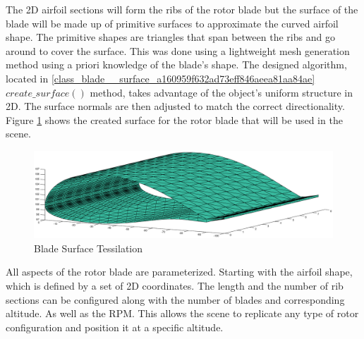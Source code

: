 The 2D airfoil sections will form the ribs of the rotor blade but the surface of the blade will be made up of primitive surfaces to approximate the curved airfoil shape. The primitive shapes are triangles that span between the ribs and go around to cover the surface. This was done using a lightweight mesh generation method using a priori knowledge of the blade's shape. The designed algorithm, located in \ref{class_blade__surface_a160959f632ad73eff846aeea81aa84ae} $create\_surface()$ method, takes advantage of the object's uniform structure in 2D. The surface normals are then adjusted to match the correct directionality. Figure \ref{fig:tessilation} shows the created surface for the rotor blade that will be used in the scene.

\begin{figure}
	\begin{center}
		\includegraphics[width=15cm]{images/radio_propagation/blade_surface_tesselation.eps}
		\caption{Blade Surface Tessilation}
		\label{fig:tessilation}
	\end{center}
\end{figure}

All aspects of the rotor blade are parameterized. Starting with the airfoil shape, which is defined by a set of 2D coordinates. The length and the number of rib sections can be configured along with the number of blades and corresponding altitude. As well as the RPM. This allows the scene to replicate any type of rotor configuration and position it at a specific altitude.

